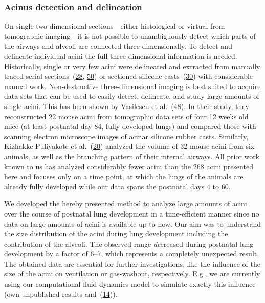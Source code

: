 \documentclass[
  american,
]{article}
\begin{document}
\hypertarget{acinus-detection-and-delineation}{%
\subsubsection{Acinus detection and delineation}\label{acinus-detection-and-delineation}}

On single two-dimensional sections---either histological or virtual from tomographic imaging---it is not possible to unambiguously detect which parts of the airways and alveoli are connected three-dimensionally.
To detect and delineate individual acini the full three-dimensional information is needed.
Historically, single or very few acini were delineated and extracted from manually traced serial sections~(\protect\hyperlink{ref-c3aIB7f9}{28}, \protect\hyperlink{ref-CPhMy3Ie}{50}) or sectioned silicone casts~(\protect\hyperlink{ref-1GJECnKBu}{30}) with considerable manual work.
Non-destructive three-dimensional imaging is best suited to acquire data sets that can be used to easily detect, delineate, and study large amounts of single acini.
This has been shown by Vasilescu et al.~(\protect\hyperlink{ref-C6OaY84D}{48}).
In their study, they reconstructed 22 mouse acini from tomographic data sets of four 12 weeks old mice (at least postnatal day 84, fully developed lungs) and compared those with scanning electron microscope images of acinar silicone rubber casts.
Similarly, Kizhakke Puliyakote et al.~(\protect\hyperlink{ref-RGBeCf8v}{20}) analyzed the volume of 32 mouse acini from six animals, as well as the branching pattern of their internal airways.
All prior work known to us has analyzed considerably fewer acini than the 268 acini presented here and focuses only on a time point, at which the lungs of the animals are already fully developed while our data spans the postnatal days 4 to 60.

We developed the hereby presented method to analyze large amounts of acini over the course of postnatal lung development in a time-efficient manner since no data on large amounts of acini is available up to now.
Our aim was to understand the size distribution of the acini during lung development including the contribution of the alveoli.
The observed range \emph{de}creased during postnatal lung development by a factor of 6--7, which represents a completely unexpected result.
The obtained data are essential for further investigations, like the influence of the size of the acini on ventilation or gas-washout, respectively.
E.g., we are currently using our computational fluid dynamics model to simulate exactly this influence (own unpublished results and~(\protect\hyperlink{ref-eb0gk6VO}{14})).
\end{document}
